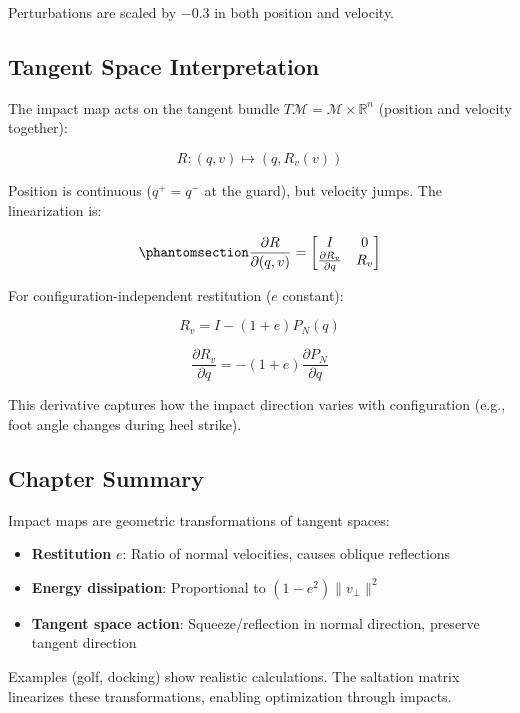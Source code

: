 \documentclass[
  letterpaper,
  DIV=11,
  numbers=noendperiod]{scrartcl}
\providecommand{\tightlist}{%
  \setlength{\itemsep}{0pt}\setlength{\parskip}{0pt}}\usepackage{longtable,booktabs,array}
\begin{document}
Perturbations are scaled by \(-0.3\) in both position and velocity.

\subsection{Tangent Space
Interpretation}\label{tangent-space-interpretation}

The impact map acts on the tangent bundle
\(T\mathcal{M} = \mathcal{M} \times \mathbb{R}^n\) (position and
velocity together):

\[
R: (q, v) \mapsto (q, R_v(v))
\]

Position is continuous (\(q^+ = q^-\) at the guard), but velocity jumps.
The linearization is:

\begin{equation}\phantomsection\label{eq-impact-tangent-bundle}{
\frac{\partial R}{\partial (q, v)} = \begin{bmatrix} I & 0 \\ \frac{\partial R_v}{\partial q} & R_v \end{bmatrix}
}\end{equation}

For configuration-independent restitution (\(e\) constant):

\[
R_v = I - (1+e) P_N(q)
\]

\[
\frac{\partial R_v}{\partial q} = -(1+e) \frac{\partial P_N}{\partial q}
\]

This derivative captures how the impact direction varies with
configuration (e.g., foot angle changes during heel strike).

\subsection{Chapter Summary}\label{chapter-summary-4}

Impact maps are geometric transformations of tangent spaces:

\begin{itemize}
\tightlist
\item
  \textbf{Restitution} \(e\): Ratio of normal velocities, causes oblique
  reflections
\item
  \textbf{Energy dissipation}: Proportional to
  \((1 - e^2) \|v_\perp\|^2\)
\item
  \textbf{Tangent space action}: Squeeze/reflection in normal direction,
  preserve tangent direction
\end{itemize}

Examples (golf, docking) show realistic calculations. The saltation
matrix linearizes these transformations, enabling optimization through
impacts.
\end{document}
